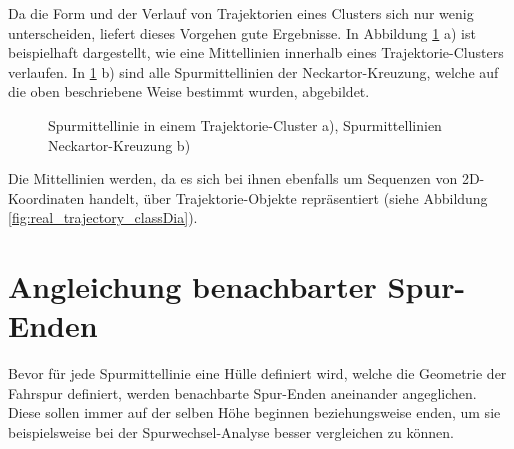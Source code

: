 Da die Form und der Verlauf von Trajektorien eines Clusters sich nur wenig unterscheiden, liefert dieses
Vorgehen gute Ergebnisse. In Abbildung \ref{fig:real2_results_centerline_detection} a) ist beispielhaft
dargestellt, wie eine Mittellinien innerhalb eines Trajektorie-Clusters verlaufen.
In \ref{fig:real2_results_centerline_detection} b) sind alle Spurmittellinien der Neckartor-Kreuzung,
welche auf die oben beschriebene Weise bestimmt wurden, abgebildet.

\begin{figure}[H]
    \centering
    \qquad
    \caption{Spurmittellinie in einem Trajektorie-Cluster a), Spurmittellinien Neckartor-Kreuzung b)}
    \label{fig:real2_results_centerline_detection}
\end{figure}

Die Mittellinien werden, da es sich bei ihnen ebenfalls um Sequenzen von 2D-Koordinaten handelt,
über Trajektorie-Objekte repräsentiert (siehe Abbildung \ref{fig:real_trajectory_classDia}).

\section{Angleichung benachbarter Spur-Enden}

Bevor für jede Spurmittellinie eine Hülle definiert wird, welche die Geometrie der Fahrspur definiert,
werden benachbarte Spur-Enden aneinander angeglichen. Diese sollen immer auf der selben Höhe beginnen
beziehungsweise enden, um sie beispielsweise bei der Spurwechsel-Analyse besser vergleichen zu können.

